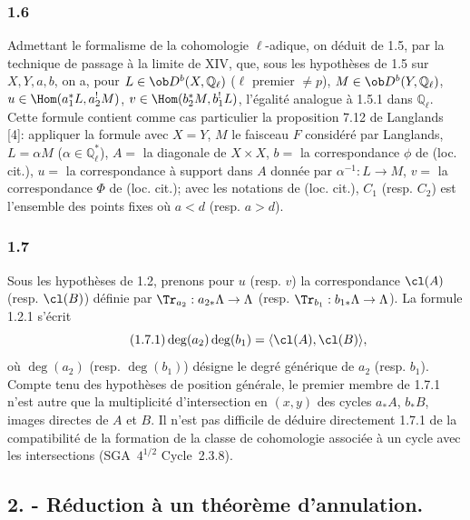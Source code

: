 \subsubsection*{1.6}
Admettant le formalisme de la cohomologie $\ell$-adique, on déduit de 1.5, par la technique de passage à la limite de XIV, que, sous les hypothèses de 1.5 sur $X,Y,a,b$, on a, pour $L\in\ob D^b(X,\mathbb{Q}_\ell)$ ($\ell$ premier $\ne p$), $M\in\ob D^b(Y,\mathbb{Q}_\ell)$, $u\in\Hom(a_1^*L,a_2^!M)$, $v\in\Hom(b_2^*M,b_1^!L)$, l'égalité analogue à 1.5.1 dans $\mathbb{Q}_\ell$. Cette formule contient comme cas particulier la proposition 7.12 de Langlands [4]: appliquer la formule avec $X=Y$, $M$ le faisceau $F$ considéré par Langlands, $L=\alpha M$ ($\alpha\in\mathbb{Q}_\ell^*$), $A=$ la diagonale de $X\times X$, $b=$ la correspondance $\phi$ de (loc. cit.), 
$u=$ la
correspondance à support dans $A$ donnée par $\alpha^{-1}:L\to M$, $v=$ la correspondance $\Phi$ de (loc. cit.); avec les notations de (loc. cit.), $C_1$ (resp. $C_2$) est l'ensemble des points fixes où $a<d$ (resp. $a>d$).

\subsubsection*{1.7}
Sous les hypothèses de 1.2, prenons pour $u$ (resp. $v$) la correspondance $\cl(A)$ (resp. $\cl(B)$) définie par $\Tr_{a_2}:a_{2*}\Lambda\to\Lambda$ (resp. $\Tr_{b_1}:b_{1*}\Lambda\to\Lambda$). La formule 1.2.1 s'écrit
\begin{equation}\tag{1.7.1}
\deg(a_2)\deg(b_1)=\langle \cl(A),\cl(B)\rangle,
\end{equation}
où $\deg(a_2)$ (resp. $\deg(b_1)$) désigne le degré générique de $a_2$ (resp. $b_1$). Compte tenu des hypothèses de position générale, le premier membre de 1.7.1 n'est autre que la multiplicité d'intersection en $(x,y)$ des cycles $a_*A$, $b_*B$, images directes de $A$ et $B$. Il n'est pas difficile de déduire directement 1.7.1 de la compatibilité de la formation de la classe de cohomologie associée à un cycle avec les intersections (SGA~$4^{1/2}$ Cycle~2.3.8).


\subsection*{2. - Réduction à un théorème d'annulation.}

